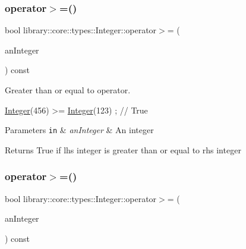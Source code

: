 \mbox{\label{classlibrary_1_1core_1_1types_1_1_integer_ae565ce34bef391725beebb42269d26fe}} 
\subsubsection{\texorpdfstring{operator$>$=()}{operator>=()}\hspace{0.1cm}{\footnotesize\ttfamily [1/2]}}
{\footnotesize\ttfamily bool library\+::core\+::types\+::\+Integer\+::operator$>$= (\begin{DoxyParamCaption}\item[{const \hyperlink{classlibrary_1_1core_1_1types_1_1_integer}{Integer} \&}]{an\+Integer }\end{DoxyParamCaption}) const}



Greater than or equal to operator. 


\begin{DoxyCode}
\hyperlink{classlibrary_1_1core_1_1types_1_1_integer_a6483b1c4e13e5ed6af5e7a58347efead}{Integer}(456) >= \hyperlink{classlibrary_1_1core_1_1types_1_1_integer_a6483b1c4e13e5ed6af5e7a58347efead}{Integer}(123) ; \textcolor{comment}{// True}
\end{DoxyCode}



\begin{DoxyParams}[1]{Parameters}
\mbox{\tt in}  & {\em an\+Integer} & An integer \\
\hline
\end{DoxyParams}
\begin{DoxyReturn}{Returns}
True if lhs integer is greater than or equal to rhs integer 
\end{DoxyReturn}
\mbox{\label{classlibrary_1_1core_1_1types_1_1_integer_a88077b530da644e33e6346837035eb9d}} 
\subsubsection{\texorpdfstring{operator$>$=()}{operator>=()}\hspace{0.1cm}{\footnotesize\ttfamily [2/2]}}
{\footnotesize\ttfamily bool library\+::core\+::types\+::\+Integer\+::operator$>$= (\begin{DoxyParamCaption}\item[{const \hyperlink{classlibrary_1_1core_1_1types_1_1_integer_a623afb1580f870fd8a1997b1c12c917d}{Integer\+::\+Value\+Type} \&}]{an\+Integer }\end{DoxyParamCaption}) const}

